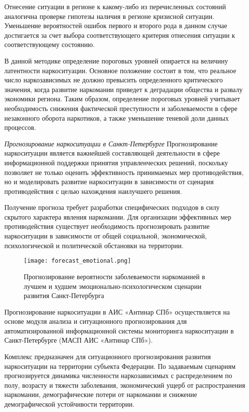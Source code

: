 Отнесение ситуации в регионе к какому-либо из перечисленных состояний аналогична
проверке гипотезы наличия в регионе кризисной ситуации. Уменьшение вероятностей
ошибок первого и второго рода в данном случае достигается за счет выбора
соответствующего критерия отнесения ситуации к соответствующему состоянию. 

В данной методике определение пороговых уровней опирается на величину
латентности наркоситуации. Основное положение состоит в том, что реальное число
наркозависимых не должно превысить определенного критического значения, когда
развитие наркомании приведет к деградации общества и развалу экономики региона.
Таким образом, определение пороговых уровней учитывает необходимость снижения
фактической преступности и заболеваемости в сфере незаконного оборота
наркотиков, а также уменьшение теневой доли данных процессов.

\textit{Прогнозирование наркоситуации в Санкт-Петербурге}
Прогнозирование наркоситуации является важнейшей составляющей деятельности в
сфере информационной поддержки принятия управленческих решений, поскольку
позволяет не только оценить эффективность принимаемых мер противодействия, но и
моделировать развитие наркоситуации в зависимости от сценария противодействия с
целью нахождения наилучшего решения.

Получение прогноза требует разработки специфических подходов в силу скрытого
характера явления наркомании. Для организации эффективных мер противодействия
существует необходимость прогнозировать развитие наркоситуации в зависимости от
общей социальной, экономической, психологической и политической  обстановки на
территории.

\begin{figure}
    \centering
    \texttt{[image: forecast\_emotional.png]}
    \caption{Прогнозирование вероятности заболеваемости наркоманией в лучшем и
    худшем эмоционально-психологическом сценарии развития Санкт-Петербурга}
    \label{fig:org_mezhved_antinar}
\end{figure}

Прогнозирование наркоситуации в АИС «Антинар СПб» осуществляется на основе
модуля анализа и ситуационного прогнозирования для автоматизированной
информационной системы мониторинга наркоситуации в Санкт-Петербурге (МАСП АИС
«Антинар СПб»). 

Комплекс предназначен для ситуационного прогнозирования развития наркоситуации
на территории субъекта Федерации. По задаваемым сценариям прогнозируется
динамика численности наркозависимых с распределением по полу, возрасту и тяжести
заболевания, экономический ущерб от распространения наркомании, демографические
потери от наркомании и снижение демографической устойчивости территории.

